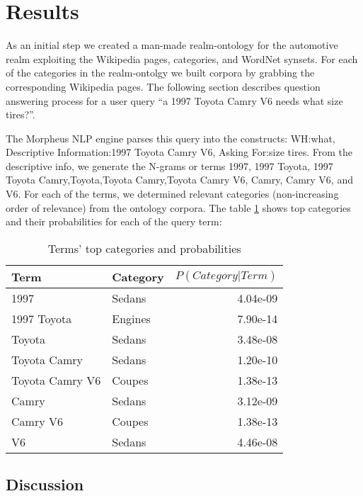 \section{Results}
\label{sec:results}


As an initial step we created a man-made realm-ontology for the automotive realm  exploiting the Wikipedia pages, categories, and WordNet synsets. For each of the categories in the realm-ontolgy we built corpora by grabbing the corresponding Wikipedia pages. The following section describes question answering process for a user query ``a 1997 Toyota Camry V6 needs what size tires?''. 

The Morpheus NLP engine parses this query into the constructs: WH:what, Descriptive Information:1997 Toyota Camry V6, Asking For:size tires. From the descriptive info, we generate the N-grams or terms 1997, 1997 Toyota, 1997 Toyota Camry,Toyota,Toyota Camry,Toyota Camry V6, Camry, Camry V6, and V6. For each of the terms, we determined relevant categories (non-increasing order of relevance) from the ontology corpora. The table \ref{tbl:term_categories} shows top categories and their probabilities for each of the query term: 

\begin{table}[h]\footnotesize

\begin{tabular}{l | l | r}
Term & Category & $P(Category|Term)$ \\
\hline
1997 & Sedans & 4.04e-09\\
1997 Toyota & Engines & 7.90e-14\\
Toyota  & Sedans & 3.48e-08\\
Toyota Camry & Sedans & 1.20e-10\\
Toyota Camry V6 & Coupes & 1.38e-13\\
Camry & Sedans & 3.12e-09\\
Camry V6 & Coupes & 1.38e-13\\
V6 & Sedans & 4.46e-08\\
\hline
\end{tabular}        

\caption{Terms' top categories and probabilities}
\label{tbl:term_categories}   


\end{table}

\subsection{Discussion}


